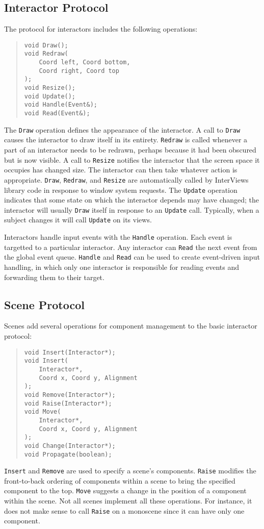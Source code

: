 \subsection*{Interactor Protocol}

The protocol for interactors includes the following operations:
\begin{quote}
\small
\begin{verbatim}
void Draw();
void Redraw(
    Coord left, Coord bottom,
    Coord right, Coord top
);
void Resize();
void Update();
void Handle(Event&);
void Read(Event&);
\end{verbatim}
\end{quote}
The {\tt Draw} operation defines the appearance of the
interactor.  A call to {\tt Draw} causes the interactor to draw itself in its
entirety.
{\tt Redraw} is called
whenever a part of an interactor needs to be redrawn,
perhaps because it had been obscured but is now visible.
A call to {\tt Resize} notifies the interactor that the 
screen space it occupies
has changed size.  The interactor can then take whatever action is
appropriate.  {\tt Draw}, {\tt Redraw}, and {\tt Resize} are automatically
called by InterViews library code in response to window system
requests.
The {\tt Update} operation indicates that some state on which the
interactor depends may have changed; the interactor will usually {\tt Draw}
itself in response to an {\tt Update} call.
Typically, when a subject changes it will call {\tt Update} on its views.

Interactors handle input events with the {\tt Handle} operation.  Each
event is targetted to a particular interactor.  Any interactor can
{\tt Read} the next event from the global event queue.  {\tt Handle}
and {\tt Read} can be used to create event-driven input handling, in
which only one interactor is responsible for reading events and
forwarding them to their target.

\subsection*{Scene Protocol}

Scenes add several operations for component management to the
basic interactor protocol:
\begin{quote}
\small
\begin{verbatim}
void Insert(Interactor*);
void Insert(
    Interactor*,
    Coord x, Coord y, Alignment
);
void Remove(Interactor*);
void Raise(Interactor*);
void Move(
    Interactor*,
    Coord x, Coord y, Alignment
);
void Change(Interactor*);
void Propagate(boolean);
\end{verbatim}
\end{quote}
{\tt Insert} and {\tt Remove} are used to specify a scene's
components.  {\tt Raise} modifies the front-to-back ordering of
components within a scene to bring the specified component to the top.
{\tt Move} suggests a change in the position of a component within the
scene.  Not all scenes implement all these operations.  For
instance, it does not make sense to call {\tt Raise} on a monoscene
since it can have only one component.

